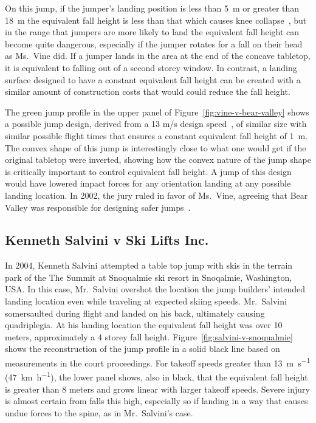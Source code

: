 \documentclass{article}
\begin{document}
On this jump, if the jumper's landing position is less than 5~\si{\meter} or
greater than 18~\si{\meter} the equivalent fall height is less than that which
causes knee collapse~\cite{Minetti1998}, but in the range that jumpers are more
likely to land the equivalent fall height can become quite dangerous,
especially if the jumper rotates for a fall on their head as Ms.~Vine did. If a
jumper lands in the area at the end of the concave tabletop, it is equivalent
to falling out of a second storey window. In contrast, a landing surface
designed to have a constant equivalent fall height can be created with a
similar amount of construction costs that would could reduce the fall height.

The green jump profile in the upper panel of
Figure~\ref{fig:vine-v-bear-valley} shows a possible jump design, derived from
a 13 m/s design speed~\cite{Levy2015}, of similar size with similar possible
flight times that ensures a constant equivalent fall height of 1~\si{\meter}.
The convex shape of this jump is interestingly close to what one would get if
the original tabletop were inverted, showing how the convex nature of the jump
shape is critically important to control equivalent fall height. A jump of this
design would have lowered impact forces for any orientation landing at any
possible landing location. In 2002, the jury ruled in favor of Ms.~Vine,
agreeing that Bear Valley was responsible for designing safer
jumps~\cite{Alvarado2002}.

\subsection{Kenneth Salvini v Ski Lifts Inc.}
%
In 2004, Kenneth Salvini attempted a table top jump with skis in the terrain
park of the The Summit at Snoqualmie ski resort in Snoqalmie, Washington, USA.
In this case, Mr.~Salvini overshot the location the jump builders' intended
landing location even while traveling at expected skiing speeds. Mr.~Salvini
somersaulted during flight and landed on his back, ultimately causing
quadriplegia. At his landing location the equivalent fall height was over 10
meters, approximately a 4 storey fall height.
Figure~\ref{fig:salvini-v-snoqualmie} shows the reconstruction of the jump
profile in a solid black line based on measurements in the court proceedings.
For takeoff speeds greater than 13~\si{\meter\per\second}
(47~\si{\kilo\meter\per\hour}), the lower panel shows, also in black, that the
equivalent fall height is greater than 8 meters and grows linear with larger
takeoff speeds. Severe injury is almost certain from falls this high,
especially so if landing in a way that causes undue forces to the spine, as in
Mr.~Salvini's case.
\end{document}
